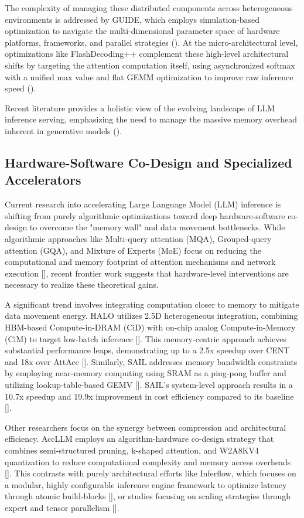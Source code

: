 \documentclass[11pt]{article}
\begin{document}
The complexity of managing these distributed components across heterogeneous environments is addressed by GUIDE, which employs simulation-based optimization to navigate the multi-dimensional parameter space of hardware platforms, frameworks, and parallel strategies (\citep{2412.04788}). At the micro-architectural level, optimizations like FlashDecoding++ complement these high-level architectural shifts by targeting the attention computation itself, using asynchronized softmax with a unified max value and flat GEMM optimization to improve raw inference speed (\citep{2311.01282}).

Recent literature provides a holistic view of the evolving landscape of LLM inference serving, emphasizing the need to manage the massive memory overhead inherent in generative models (\citep{2504.19720}).
\subsection{Hardware-Software Co-Design and Specialized Accelerators}

Current research into accelerating Large Language Model (LLM) inference is shifting from purely algorithmic optimizations toward deep hardware-software co-design to overcome the "memory wall" and data movement bottlenecks. While algorithmic approaches like Multi-query attention (MQA), Grouped-query attention (GQA), and Mixture of Experts (MoE) focus on reducing the computational and memory footprint of attention mechanisms and network execution [\citep{2407.09111}], recent frontier work suggests that hardware-level interventions are necessary to realize these theoretical gains.

A significant trend involves integrating computation closer to memory to mitigate data movement energy. HALO utilizes 2.5D heterogeneous integration, combining HBM-based Compute-in-DRAM (CiD) with on-chip analog Compute-in-Memory (CiM) to target low-batch inference [\citep{2510.02675}]. This memory-centric approach achieves substantial performance leaps, demonstrating up to a 2.5x speedup over CENT and 18x over AttAcc [\citep{2510.02675}]. Similarly, SAIL addresses memory bandwidth constraints by employing near-memory computing using SRAM as a ping-pong buffer and utilizing lookup-table-based GEMV [\citep{2509.25853}]. SAIL's system-level approach results in a 10.7x speedup and 19.9x improvement in cost efficiency compared to its baseline [\citep{2509.25853}].

Other researchers focus on the synergy between compression and architectural efficiency. AccLLM employs an algorithm-hardware co-design strategy that combines semi-structured pruning, k-shaped attention, and W2A8KV4 quantization to reduce computational complexity and memory access overheads [\citep{2505.03745}]. This contrasts with purely architectural efforts like Inferflow, which focuses on a modular, highly configurable inference engine framework to optimize latency through atomic build-blocks [\citep{2401.08294}], or studies focusing on scaling strategies through expert and tensor parallelism [\citep{2506.00008}].
\end{document}
